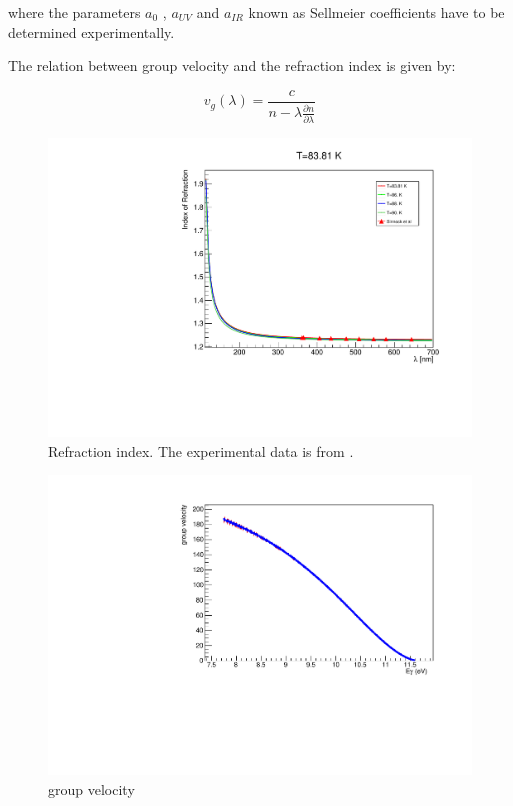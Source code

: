 \documentclass{article}
\begin{document}
where the parameters $a_0$ , $a_{UV}$ and $a_{IR}$ known as Sellmeier coefficients have to be determined
experimentally.
 
 The relation between group velocity and the refraction index is given by:

\begin{equation}
  v_g (\lambda)= \frac{c}{n-\lambda \frac{\partial{n}}{\partial{\lambda}}}
      \label{equ:vgroup}
\end{equation}

 


\begin{figure}[ht]
\begin{center}
\includegraphics[width=35.5pc]{sellmeier.pdf}
\end{center}
\caption{\label{fig:sellmeier}Refraction index. The experimental data is from \cite{ref:Sinnock}.}
\end{figure}
\begin{figure}[ht]
\begin{center}
\includegraphics[width=35.5pc]{vg.pdf}
\end{center}
\caption{\label{fig:vg}group velocity}
\end{figure}
\end{document}
